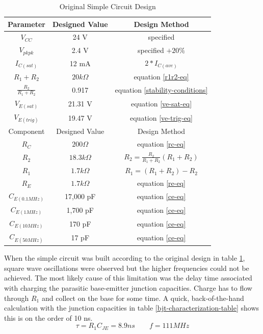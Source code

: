 \documentclass[titlepage, letterpaper, 10.5pt]{article}
\begin{document}
\begin{table}[ht]
\centering
\caption{Original Simple Circuit Design}
\begin{tabular}{c | c | c}
\hline\hline
Parameter	&Designed Value	&Design Method	\\
\hline\hline
$V_{CC}$	&24 V	&specified	\\
$V_{pkpk}$	&2.4 V	&specified $+20\%$	\\
$I_{C(sat)}$	&12 mA	&$2*I_{C(ave)}$	\\
$R_{1}+R_{2}$	&$20k\Omega$	&equation \ref{r1r2-eq}	\\
$\frac{R_{2}}{R_{1}+R_{2}}$	&0.917	&equation \ref{stability-conditions}	\\
$V_{E(sat)}$	&21.31 V	&equation \ref{ve-sat-eq}	\\
$V_{E(trig)}$	&19.47 V	&equation \ref{ve-trig-eq}	\\
\hline
Component	&Designed Value	&Design Method	\\
\hline
$R_{C}$	&$200\Omega$	&equation \ref{rc-eq}	\\
$R_{2}$	&$18.3k\Omega$	&$R_{2}=\frac{R_{2}}{R_{1}+R_{2}}(R_{1}+R_{2})$	\\
$R_{1}$	&$1.7k\Omega$	&$R_{1}=(R_{1}+R_{2})-R_{2}$	\\
$R_{E}$	&$1.7k\Omega$	&equation \ref{re-eq}	\\
$C_{E(0.1MHz)}$	&17,000 pF	&equation \ref{ce-eq}	\\
$C_{E(1MHz)}$	&1,700 pF	&equation \ref{ce-eq}	\\
$C_{E(10MHz)}$	&170 pF	&equation \ref{ce-eq}	\\
$C_{E(50MHz)}$	&17 pF	&equation \ref{ce-eq}	\\
\hline\hline
\end{tabular}
\label{simple-circuit-design-table}
\end{table}

When the simple circuit was built according to the original design in table
\ref{simple-circuit-design-table},
square wave oscillations were observed but the higher frequencies could not be achieved.
The most likely cause of this limitation was the delay time associated with charging the
parasitic base-emitter junction capacities. Charge has to flow through $R_{1}$ and collect
on the base for some time.
A quick, back-of-the-hand calculation with the junction capacities in table \ref{bjt-characterization-table}
shows this is on the order of 10 ns.
\begin{equation*}
\tau=R_{1}C_{JE}=8.9ns\quad\quad f=111MHz
\end{equation*}
\end{document}
